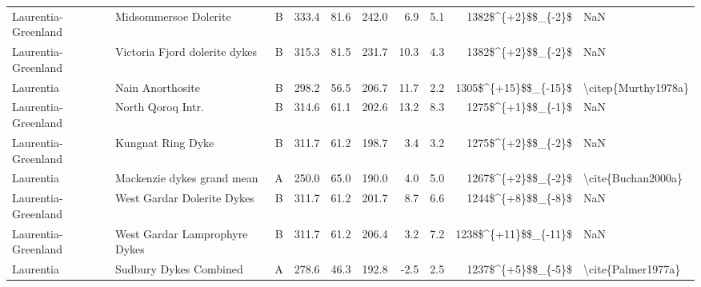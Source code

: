 \begin{longtable}{p{1 in}p{1 in}rrrrrrr}
           Laurentia-Greenland &                              Midsommersoe Dolerite &      B &     333.4 &      81.6 & 242.0 &   6.9 &       5.1 &     1382\$\textasciicircum \{+2\}\$\$\_\{-2\}\$ &                                                NaN \\
           Laurentia-Greenland &                      Victoria Fjord dolerite dykes &      B &     315.3 &      81.5 & 231.7 &  10.3 &       4.3 &     1382\$\textasciicircum \{+2\}\$\$\_\{-2\}\$ &                                                NaN \\
                     Laurentia &                                   Nain Anorthosite &      B &     298.2 &      56.5 & 206.7 &  11.7 &       2.2 &   1305\$\textasciicircum \{+15\}\$\$\_\{-15\}\$ &                                \textbackslash citep\{Murthy1978a\} \\
           Laurentia-Greenland &                                  North Qoroq Intr. &      B &     314.6 &      61.1 & 202.6 &  13.2 &       8.3 &     1275\$\textasciicircum \{+1\}\$\$\_\{-1\}\$ &                                                NaN \\
           Laurentia-Greenland &                                  Kungnat Ring Dyke &      B &     311.7 &      61.2 & 198.7 &   3.4 &       3.2 &     1275\$\textasciicircum \{+2\}\$\$\_\{-2\}\$ &                                                NaN \\
                     Laurentia &                         Mackenzie dykes grand mean &      A &     250.0 &      65.0 & 190.0 &   4.0 &       5.0 &     1267\$\textasciicircum \{+2\}\$\$\_\{-2\}\$ &                                 \textbackslash cite\{Buchan2000a\} \\
           Laurentia-Greenland &                         West Gardar Dolerite Dykes &      B &     311.7 &      61.2 & 201.7 &   8.7 &       6.6 &     1244\$\textasciicircum \{+8\}\$\$\_\{-8\}\$ &                                                NaN \\
           Laurentia-Greenland &                      West Gardar Lamprophyre Dykes &      B &     311.7 &      61.2 & 206.4 &   3.2 &       7.2 &   1238\$\textasciicircum \{+11\}\$\$\_\{-11\}\$ &                                                NaN \\
                     Laurentia &                             Sudbury Dykes Combined &      A &     278.6 &      46.3 & 192.8 &  -2.5 &       2.5 &     1237\$\textasciicircum \{+5\}\$\$\_\{-5\}\$ &                                 \textbackslash cite\{Palmer1977a\} \\

\end{longtable}
